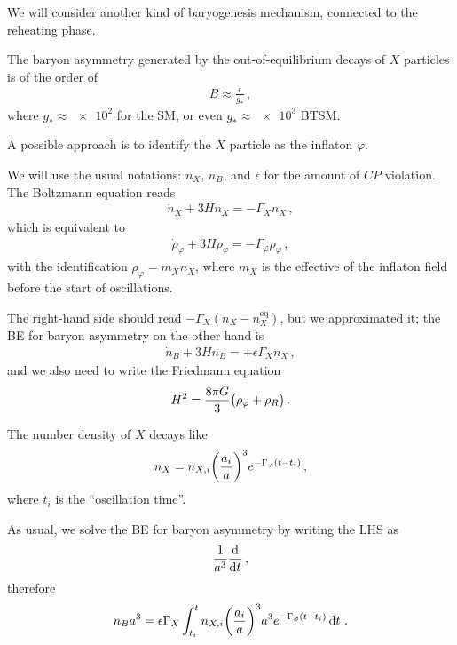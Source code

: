 \documentclass[main.tex]{subfiles}
\begin{document}

We will consider another kind of baryogenesis mechanism, connected to the reheating phase. 

The baryon asymmetry generated by the out-of-equilibrium decays of \(X\) particles is of the order of 
%
\begin{align}
B \approx \frac{\epsilon}{g_*}
\,,
\end{align}
%
where \(g_* \approx \num{e2}\) for the SM, or even \(g_* \approx \num{e3}\) BTSM.

A possible approach is to identify the \(X\) particle as the inflaton \(\varphi \). 

We will use the usual notations: \(n_X\), \(n_B\), and \(\epsilon \) for the amount of \(CP\) violation.
The Boltzmann equation reads 
%
\begin{align}
\dot{n}_X + 3H n_X = - \Gamma _X n_X
\,,
\end{align}
%
which is equivalent to 
%
\begin{align}
\dot{\rho}_\varphi + 3 H \rho _\varphi = - \Gamma _\varphi \rho _\varphi 
\,,
\end{align}
%
with the identification \(\rho _\varphi = m_X n_X\), where \(m_X\) is the effective of the inflaton field before the start of oscillations. 

The right-hand side should read \(- \Gamma _X (n_X - n_X^{\text{eq}})\), but we approximated it; the BE for baryon asymmetry on the other hand is 
%
\begin{align}
\dot{n}_B + 3 H n_B = +\epsilon \Gamma _X n_X
\,,
\end{align}
%
and we also need to write the Friedmann equation 
%
\begin{align}
H^2 = \frac{8 \pi G}{3} \qty(\rho _\varphi +\rho _R)
\,.
\end{align}

The number density of \(X\) decays like 
%
\begin{align}
n_X = n_{X, i} \qty(\frac{a_i}{a})^3 e^{-\Gamma _\varphi (t - t_i)}
\,,
\end{align}
%
where \(t_i\) is the ``oscillation time''. 

As usual, we solve the BE for baryon asymmetry by writing the LHS as 
%
\begin{align}
\frac{1}{a^3} \dv[]{}{t} (n_B a^3) 
\,,
\end{align}
%
therefore 
%
\begin{align}
n_B a^3 = \epsilon \Gamma _X \int_{t_i}^{t} n_{X, i} \qty(\frac{a_i}{a})^3 a^3e^{- \Gamma _\varphi (t - t_i)} \dd{t}
\,.
\end{align}
\end{document}
